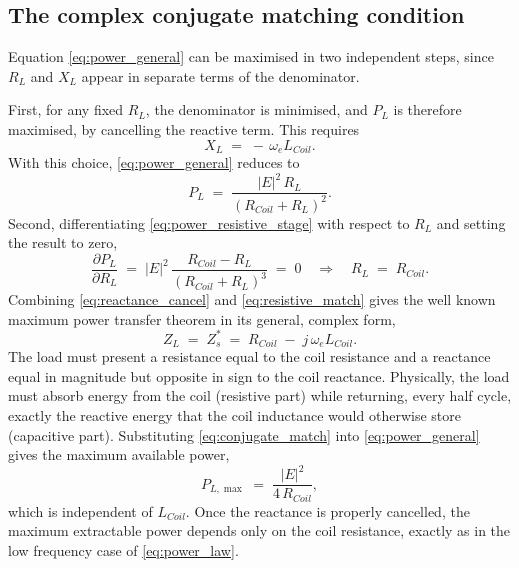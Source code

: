 \subsection{The complex conjugate matching condition}

Equation \eqref{eq:power_general} can be maximised in two independent steps, since $R_L$ and $X_L$ appear in separate terms of the denominator.

First, for any fixed $R_L$, the denominator is minimised, and $P_L$ is therefore maximised, by cancelling the reactive term. This requires
\begin{equation}
    X_L \;=\; -\,\omega_e L_{Coil}.
    \label{eq:reactance_cancel}
\end{equation}
With this choice, \eqref{eq:power_general} reduces to
\begin{equation}
    P_L \;=\; \frac{|E|^2\,R_L}{(R_{Coil}+R_L)^2}.
    \label{eq:power_resistive_stage}
\end{equation}
Second, differentiating \eqref{eq:power_resistive_stage} with respect to $R_L$ and setting the result to zero,
\begin{equation}
    \frac{\partial P_L}{\partial R_L} \;=\; |E|^2\,\frac{R_{Coil}-R_L}{(R_{Coil}+R_L)^3} \;=\; 0
    \quad\Longrightarrow\quad
    R_L \;=\; R_{Coil}.
    \label{eq:resistive_match}
\end{equation}
Combining \eqref{eq:reactance_cancel} and \eqref{eq:resistive_match} gives the well known maximum power transfer theorem in its general, complex form,
\begin{equation}
    Z_L \;=\; Z_s^{*} \;=\; R_{Coil} \;-\; j\,\omega_e L_{Coil}.
    \label{eq:conjugate_match}
\end{equation}
The load must present a resistance equal to the coil resistance and a reactance equal in magnitude but opposite in sign to the coil reactance. Physically, the load must absorb energy from the coil (resistive part) while returning, every half cycle, exactly the reactive energy that the coil inductance would otherwise store (capacitive part). Substituting \eqref{eq:conjugate_match} into \eqref{eq:power_general} gives the maximum available power,
\begin{equation}
    P_{L,\max} \;=\; \frac{|E|^2}{4\,R_{Coil}},
    \label{eq:max_power}
\end{equation}
which is independent of $L_{Coil}$. Once the reactance is properly cancelled, the maximum extractable power depends only on the coil resistance, exactly as in the low frequency case of \eqref{eq:power_law}.

